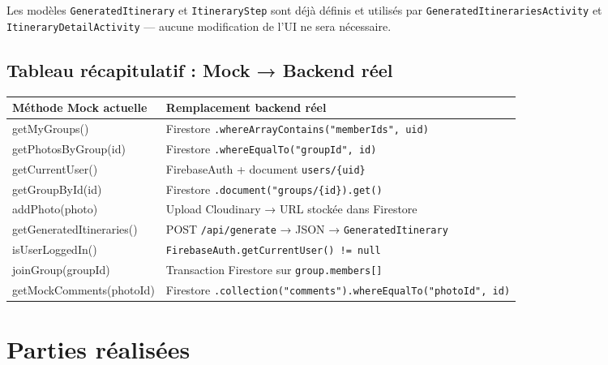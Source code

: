 \documentclass[a4paper,11pt]{article}
\begin{document}
\noindent Les modèles \texttt{GeneratedItinerary} et \texttt{ItineraryStep} sont déjà définis et utilisés par \texttt{GeneratedItinerariesActivity} et \texttt{ItineraryDetailActivity} — aucune modification de l'UI ne sera nécessaire.

\subsection{Tableau récapitulatif : Mock → Backend réel}

\begin{tabularx}{\textwidth}{>{\ttfamily\small}p{5.2cm} X}
\toprule
\textbf{Méthode Mock actuelle} & \textbf{Remplacement backend réel} \\
\midrule
getMyGroups() & Firestore \texttt{.whereArrayContains("memberIds", uid)} \\
getPhotosByGroup(id) & Firestore \texttt{.whereEqualTo("groupId", id)} \\
getCurrentUser() & FirebaseAuth + document \texttt{users/\{uid\}} \\
getGroupById(id) & Firestore \texttt{.document("groups/\{id\}).get()} \\
addPhoto(photo) & Upload Cloudinary → URL stockée dans Firestore \\
getGeneratedItineraries() & POST \texttt{/api/generate} → JSON → \texttt{GeneratedItinerary} \\
isUserLoggedIn() & \texttt{FirebaseAuth.getCurrentUser() != null} \\
joinGroup(groupId) & Transaction Firestore sur \texttt{group.members[]} \\
getMockComments(photoId) & Firestore \texttt{.collection("comments").whereEqualTo("photoId", id)} \\
\bottomrule
\end{tabularx}

\section{Parties réalisées}
\end{document}
